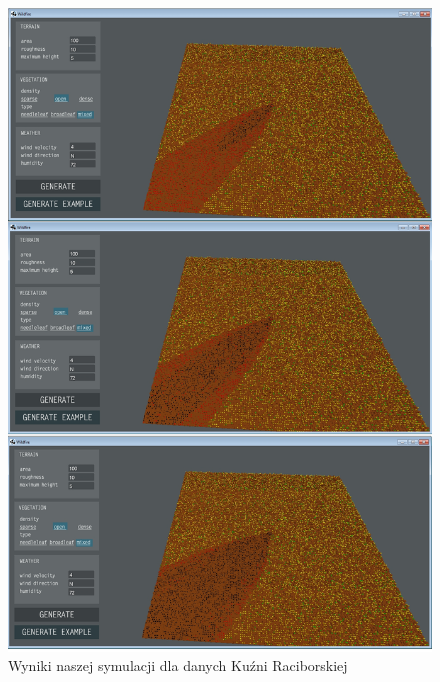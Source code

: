 \documentclass[a4paper, 11pt]{article}
\begin{document}
	\begin{figure}[H]
		\centerline{\includegraphics[scale=0.4]{kuznia5}}
		\raggedright{	\caption{Wyniki naszej symulacji dla danych Kuźni Raciborskiej}}
	\end{figure}
	
	
\end{document}
